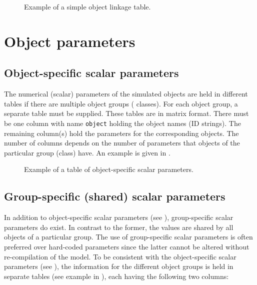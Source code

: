 \begin{figure*}[htbp]
  
  \caption{Example of a simple object linkage table. \label{fig:input-objectLinkageTable}}
\end{figure*}

\section{Object parameters}

\subsection{Object-specific scalar parameters} \label{sec:input-indivParamNum}

The numerical (scalar) parameters of the simulated objects are held in different tables if there are multiple object groups (\ie{} classes). For each object group, a separate table must be supplied. These tables are in matrix format. There must be one column with name \verb!object! holding the object names (ID strings). The remaining column(s) hold the parameters for the corresponding objects. The number of columns depends on the number of parameters that objects of the particular group (class) have. An example is given in .

\begin{figure*}[htbp]
  
  \caption{Example of a table of object-specific scalar parameters. \label{fig:input-indivParamNum}}
\end{figure*}

\subsection{Group-specific (shared) scalar parameters} \label{sec:input-sharedParamNum}

In addition to object-specific scalar parameters (see ), group-specific scalar parameters do exist. In contrast to the former, the values are shared by all objects of a particular group. The use of group-specific scalar parameters is often preferred over hard-coded parameters since the latter cannot be altered without re-compilation of the model. To be consistent with the object-specific scalar parameters (see ), the information for the different object groups is held in separate tables (see example in ), each having the following two columns:

